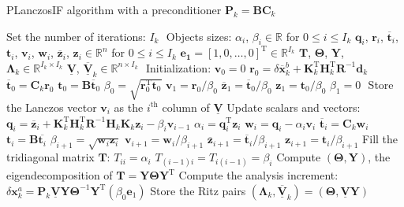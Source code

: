 \documentclass[12pt]{scrartcl}
\begin{document}
\begin{algorithm}[!ht]
\caption{PLanczosIF algorithm with a preconditioner $\mathbf{P}_k = \mathbf{B}\mathbf{C}_k$\label{algo:planczosif}}
\begin{algorithmic}
\STATE Set the number of iterations: $I_k$
\STATE $  $
\STATE Objects sizes:
\STATE $\alpha_i$, $\beta_i \in \mathbb{R}$ for $0 \le i \le I_k$
\STATE $\mathbf{q}_i$, $\mathbf{r}_i$, $\overline{\mathbf{t}}_i$, $\mathbf{t}_i$, $\mathbf{v}_i$, $\mathbf{w}_i$, $\overline{\mathbf{z}}_i$, $\mathbf{z}_i \in \mathbb{R}^n$ for $0 \le i \le I_k$
\STATE $\mathbf{e_1} = [1,0,\dots,0]^\mathrm{T} \in \mathbb{R}^{I_k}$
\STATE $\mathbf{T}$, $\boldsymbol{\Theta}$, $\mathbf{Y}$, $\boldsymbol{\Lambda}_k \in \mathbb{R}^{I_k \times I_k}$
\STATE $\underline{\mathbf{V}}$, $\underline{\overline{\mathbf{V}}}_k \in \mathbb{R}^{n \times I_k}$
\STATE $  $
\STATE Initialization:
\STATE $\mathbf{v}_0 = 0$
\STATE $\mathbf{r}_0 = \delta \overline{\mathbf{x}}^b_k + \mathbf{K}_k^\mathrm{T} \mathbf{H}_k^\mathrm{T} \mathbf{R}^{-1} \mathbf{d}_k$
\STATE $\overline{\mathbf{t}}_0 = \mathbf{C}_k \mathbf{r}_0$
\STATE $\mathbf{t}_0 = \mathbf{B} \overline{\mathbf{t}}_0$
\STATE $\beta_0 = \sqrt{\mathbf{r}_0^\mathrm{T} \mathbf{t}_0}$
\STATE $\mathbf{v}_1 = \mathbf{r}_0/\beta_0$
\STATE $\overline{\mathbf{z}}_1 = \overline{\mathbf{t}}_0/\beta_0$
\STATE $\mathbf{z}_1 = \mathbf{t}_0/\beta_0$
\STATE $\beta_1 = 0$
\STATE $  $
\STATE Store the Lanczos vector $\mathbf{v}_i$ as the $i^\text{th}$ column of $\underline{\mathbf{V}}$
\STATE Update scalars and vectors:
\STATE $\mathbf{q}_i = \overline{\mathbf{z}}_i + \mathbf{K}_k^\mathrm{T} \mathbf{H}_k^\mathrm{T} \mathbf{R}^{-1} \mathbf{H}_k \mathbf{K}_k \mathbf{z}_i - \beta_i \mathbf{v}_{i-1}$ 
\STATE $\alpha_i = \mathbf{q}_i^\mathrm{T} \mathbf{z}_i$
\STATE $\mathbf{w}_i = \mathbf{q}_i - \alpha_i \mathbf{v}_i$
\STATE $\overline{\mathbf{t}}_i = \mathbf{C}_k \mathbf{w}_i$
\STATE $\mathbf{t}_i = \mathbf{B} \overline{\mathbf{t}_i}$
\STATE $\beta_{i+1} = \sqrt{\mathbf{w}_i \mathbf{z}_i}$
\STATE $\mathbf{v}_{i+1} = \mathbf{w}_i/\beta_{i+1}$
\STATE $\overline{\mathbf{z}}_{i+1} = \overline{\mathbf{t}}_i/\beta_{i+1}$
\STATE $\mathbf{z}_{i+1} = \mathbf{t}_i/\beta_{i+1}$
\STATE Fill the tridiagonal matrix $\mathbf{T}$:
\STATE $T_{ii} = \alpha_i$
\STATE $T_{(i-1)i} = T_{i(i-1)} = \beta_i$
\ENDIF
\ENDFOR
\STATE Compute $\left(\boldsymbol{\Theta},\mathbf{Y}\right)$, the eigendecomposition of $\mathbf{T} = \mathbf{Y} \boldsymbol{\Theta} \mathbf{Y}^\mathrm{T}$
\STATE Compute the analysis increment: $\delta \mathbf{x}^a_k = \mathbf{P}_k \underline{\mathbf{V}} \mathbf{Y} \boldsymbol{\Theta}^{-1} \mathbf{Y}^\mathrm{T} \left(\beta_0 \mathbf{e}_1\right)$
\STATE Store the Ritz pairs $\left(\boldsymbol{\Lambda}_k,\underline{\overline{\mathbf{V}}}_k \right) = \left(\boldsymbol{\Theta},\underline{\mathbf{V}} \mathbf{Y}\right)$
\end{algorithmic}
\end{algorithm}
\end{document}
